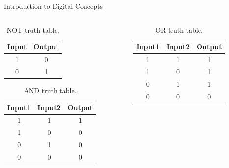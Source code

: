 \documentclass{beamer}
\begin{document}
\begin{frame}{Introduction to Digital Concepts}
\begin{columns}[T]
\begin{column}{0.5\textwidth}
\begin{table}
\centering
\begin{tabular}{c | c}
Input & Output \\ \hline
1 & 0 \\ \hline
0 & 1 \\
\end{tabular}
\caption{\label{tab:not} NOT truth table.}
\end{table}
\begin{table}
\centering
\begin{tabular}{c | c | c}
Input1 & Input2 & Output \\ \hline
1 & 1 & 1 \\ \hline
1 & 0 & 0 \\ \hline
0 & 1 & 0 \\ \hline
0 & 0 & 0 \\ \hline
\end{tabular}
\caption{\label{tab:and} AND truth table.}
\end{table}
\end{column}
\begin{column}{0.5\textwidth}
\begin{table}
\centering
\begin{tabular}{c | c | c}
Input1 & Input2 & Output \\ \hline
1 & 1 & 1 \\ \hline
1 & 0 & 1 \\ \hline
0 & 1 & 1 \\ \hline
0 & 0 & 0 \\ \hline
\end{tabular}
\caption{\label{tab:or} OR truth table.}
\end{table}
\end{column}
\end{columns}
\end{frame}
\end{document}
